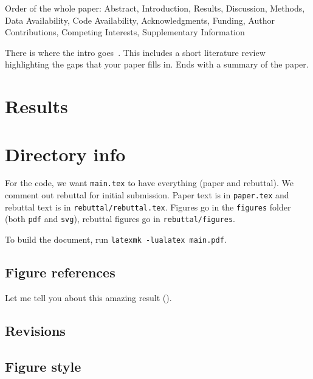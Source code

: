 \begin{refsegment}
Order of the whole paper: Abstract, Introduction, Results, Discussion, Methods,
Data Availability, Code Availability, Acknowledgments, Funding, Author
Contributions, Competing Interests, Supplementary Information

There is where the intro
goes~\autocite{schwartzTooManyCellsIdentifiesVisualizes2020}. This includes a
short literature review highlighting the gaps that your paper fills in. Ends
with a summary of the paper.

\section*{Results}

\section*{Directory info}

For the code, we want \texttt{main.tex} to have everything (paper and rebuttal).
We comment out rebuttal for initial submission. Paper text is in
\texttt{paper.tex} and rebuttal text is in \texttt{rebuttal/rebuttal.tex}.
Figures go in the \texttt{figures} folder (both \texttt{pdf} and \texttt{svg}),
rebuttal figures go in \texttt{rebuttal/figures}.

To build the document, run \texttt{latexmk -lualatex main.pdf}.

\subsection*{Figure references}

Let me tell you about this amazing result
().

\subsection*{Revisions}


\subsection*{Figure style}


\end{refsegment}
